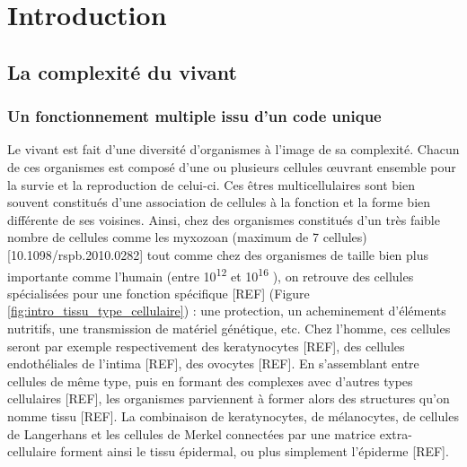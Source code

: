 \setcounter{chapter}{1}         %
\setcounter{section}{0}
\chapter*{Introduction}         %
\label{chapter:intro}
\graphicspath{ {./img/intro} }





\section{La complexité du vivant}

\subsection{Un fonctionnement multiple issu d'un code unique}

Le vivant est fait d'une diversité d'organismes à l'image de sa complexité. Chacun de ces organismes est composé d'une ou plusieurs cellules œuvrant ensemble pour la survie et la reproduction de celui-ci. Ces êtres multicellulaires sont bien souvent constitués d’une association de cellules à la fonction et la forme bien différente de ses voisines. Ainsi, chez des organismes constitués d'un très faible nombre de cellules comme les myxozoan (maximum de 7 cellules) [10.1098/rspb.2010.0282] tout comme chez des organismes de taille bien plus importante comme l'humain (entre 10\textsuperscript{12} et 10\textsuperscript{16} \cite{Bianconi2013}), on retrouve des cellules spécialisées pour une fonction spécifique [REF] (Figure \ref{fig:intro_tissu_type_cellulaire}) : une protection, un acheminement d'éléments nutritifs, une transmission de matériel génétique, etc. Chez l’homme, ces cellules seront par exemple respectivement des keratynocytes [REF], des cellules endothéliales de l’intima [REF], des ovocytes [REF]. En s’assemblant entre cellules de même type, puis en formant des complexes avec d’autres types cellulaires [REF], les organismes parviennent à former alors des structures qu’on nomme tissu [REF]. La combinaison de keratynocytes, de mélanocytes, de cellules de Langerhans et les cellules de Merkel connectées par une matrice extra-cellulaire forment ainsi le tissu épidermal, ou plus simplement l’épiderme [REF].

